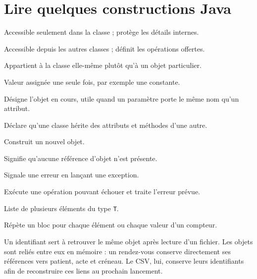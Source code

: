 \documentclass[11pt,a4paper]{report}
\begin{document}
\chapter{Lire quelques constructions Java}
\begin{description}[leftmargin=3.1cm,style=nextline]
\item[\texttt{private}] Accessible seulement dans la classe ; protège les détails internes.
\item[\texttt{public}] Accessible depuis les autres classes ; définit les opérations offertes.
\item[\texttt{static}] Appartient à la classe elle-même plutôt qu'à un objet particulier.
\item[\texttt{final}] Valeur assignée une seule fois, par exemple une constante.
\item[\texttt{this}] Désigne l'objet en cours, utile quand un paramètre porte le même nom qu'un attribut.
\item[\texttt{extends}] Déclare qu'une classe hérite des attributs et méthodes d'une autre.
\item[\texttt{new}] Construit un nouvel objet.
\item[\texttt{null}] Signifie qu'aucune référence d'objet n'est présente.
\item[\texttt{throw}] Signale une erreur en lançant une exception.
\item[\texttt{try/catch}] Exécute une opération pouvant échouer et traite l'erreur prévue.
\item[\texttt{List<T>}] Liste de plusieurs éléments du type \texttt{T}.
\item[\texttt{for}] Répète un bloc pour chaque élément ou chaque valeur d'un compteur.
\end{description}

Un identifiant sert à retrouver le même objet après lecture d'un fichier. Les objets sont reliés entre eux en mémoire : un rendez-vous conserve directement ses références vers patient, acte et créneau. Le CSV, lui, conserve leurs identifiants afin de reconstruire ces liens au prochain lancement.
\end{document}
